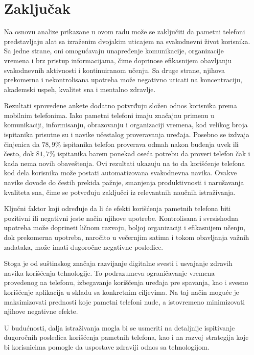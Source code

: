 \documentclass{article}
\begin{document}
\newpage
\section{Zaključak}


Na osnovu analize prikazane u ovom radu može se zaključiti da pametni telefoni predstavljaju alat sa izraženim dvojakim uticajem na svakodnevni život korisnika. Sa jedne strane, oni omogućavaju unapređenje komunikacije, organizacije vremena i brz pristup informacijama, čime doprinose efikasnijem obavljanju svakodnevnih aktivnosti i kontinuiranom učenju. Sa druge strane, njihova prekomerna i nekontrolisana upotreba može negativno uticati na koncentraciju, akademski uspeh, kvalitet sna i mentalno zdravlje.

Rezultati sprovedene ankete dodatno potvrđuju složen odnos korisnika prema mobilnim telefonima. Iako pametni telefoni imaju značajnu primenu u komunikaciji, informisanju, obrazovanju i organizaciji vremena, kod velikog broja ispitanika prisutne su i navike učestalog proveravanja uređaja. Posebno se izdvaja činjenica da $78{,}9\%$ ispitanika telefon proverava odmah nakon buđenja uvek ili često, dok $81{,}7\%$ ispitanika barem ponekad oseća potrebu da proveri telefon čak i kada nema novih obaveštenja. Ovi rezultati ukazuju na to da korišćenje telefona kod dela korisnika može postati automatizovana svakodnevna navika. Ovakve navike dovode do čestih prekida pažnje, smanjenja produktivnosti i narušavanja kvaliteta sna, čime se potvrđuju zaključci iz relevantnih naučnih istraživanja.

Ključni faktor koji određuje da li će efekti korišćenja pametnih telefona biti pozitivni ili negativni jeste način njihove upotrebe. Kontrolisana i svrsishodna upotreba može doprineti ličnom razvoju, boljoj organizaciji i efikasnijem učenju, dok prekomerna upotreba, naročito u večernjim satima i tokom obavljanja važnih zadataka, može imati dugoročne negativne posledice.

Stoga je od suštinskog značaja razvijanje digitalne svesti i usvajanje zdravih navika korišćenja tehnologije. To podrazumeva ograničavanje vremena provedenog na telefonu, izbegavanje korišćenja uređaja pre spavanja, kao i svesno korišćenje aplikacija u skladu sa konkretnim ciljevima. Na taj način moguće je maksimizovati prednosti koje pametni telefoni nude, a istovremeno minimizovati njihove negativne efekte.

U budućnosti, dalja istraživanja mogla bi se usmeriti na detaljnije ispitivanje dugoročnih posledica korišćenja pametnih telefona, kao i na razvoj strategija koje bi korisnicima pomogle da uspostave zdraviji odnos sa tehnologijom.
\end{document}
